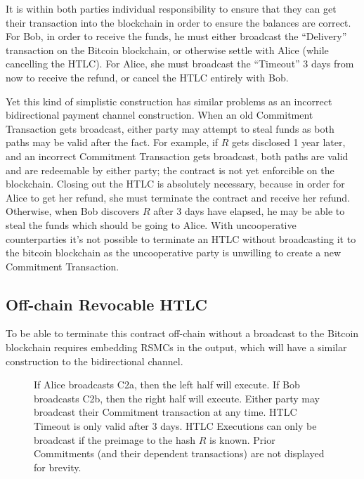 \documentclass[letterpaper,11pt]{article}
\begin{document}
It is within both parties individual responsibility to ensure that they can get
their transaction into the blockchain in order to ensure the balances are
correct. For Bob, in order to receive the funds, he must either broadcast the
``Delivery'' transaction on the Bitcoin blockchain, or otherwise settle with
Alice (while cancelling the HTLC). For Alice, she must broadcast the ``Timeout''
3 days from now to receive the refund, or cancel the HTLC entirely with Bob.

Yet this kind of simplistic construction has similar problems as an incorrect
bidirectional payment channel construction. When an old Commitment Transaction
gets broadcast, either party may attempt to steal funds as both paths may be
valid after the fact. For example, if $R$ gets disclosed 1 year later, and an
incorrect Commitment Transaction gets broadcast, both paths are valid and are
redeemable by either party; the contract is not yet enforcible on the
blockchain. Closing out the HTLC is absolutely necessary, because in order for
Alice to get her refund, she must terminate the contract and receive her refund.
Otherwise, when Bob discovers $R$ after 3 days have elapsed, he may be able to
steal the funds which should be going to Alice. With uncooperative
counterparties it's not possible to terminate an HTLC without broadcasting it to
the bitcoin blockchain as the uncooperative party is unwilling to create a new
Commitment Transaction. 

\subsection{Off-chain Revocable HTLC}

To be able to terminate this contract off-chain without a broadcast to the
Bitcoin blockchain requires embedding RSMCs in the output, which will have a
similar construction to the bidirectional channel.

\begin{figure}[H]
	\vspace*{-2cm}
	\caption{If Alice broadcasts C2a, then the left half will execute. If
		Bob broadcasts C2b, then the right half will execute. Either
		party may broadcast their Commitment transaction at any time.
		HTLC Timeout is only valid after 3 days. HTLC Executions can
		only be broadcast if the preimage to the hash $R$ is known.
		Prior Commitments (and their dependent transactions) are not
		displayed for brevity.
	}
\end{figure}
\end{document}
